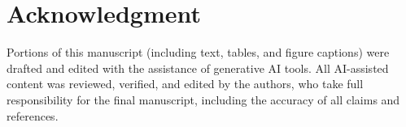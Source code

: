 \documentclass[10pt,conference]{IEEEtran}
\theoremstyle{definition}
\begin{document}
\section*{Acknowledgment}
Portions of this manuscript (including text, tables, and figure captions) were drafted and edited with the assistance of generative AI tools. All AI-assisted content was reviewed, verified, and edited by the authors, who take full responsibility for the final manuscript, including the accuracy of all claims and references.



\end{document}
